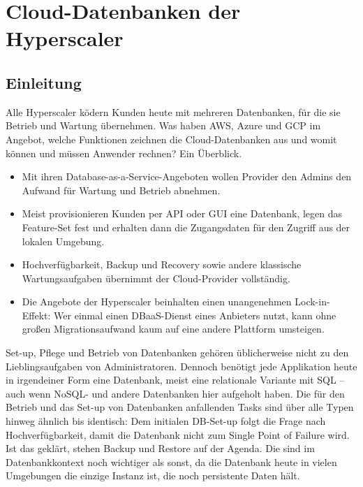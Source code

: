 %
%
%
%




\chapter{Cloud-Datenbanken der Hyperscaler}

\section{Einleitung}

Alle Hyperscaler ködern Kunden heute mit mehreren Datenbanken, für die sie Betrieb und Wartung übernehmen. Was haben AWS, Azure und GCP im Angebot, welche Funktionen zeichnen die Cloud-Datenbanken aus und womit können und müssen Anwender rechnen? Ein Überblick.

\begin{itemize}
  \item Mit ihren Database-as-a-Service-Angeboten wollen Provider den Admins den Aufwand für Wartung und Betrieb abnehmen.
  \item Meist provisionieren Kunden per API oder GUI eine Datenbank, legen das Feature-Set fest und erhalten dann die Zugangsdaten für den Zugriff aus der lokalen Umgebung.
  \item Hochverfügbarkeit, Backup und Recovery sowie andere klassische Wartungsaufgaben übernimmt der Cloud-Provider vollständig.
  \item Die Angebote der Hyperscaler beinhalten einen unangenehmen Lock-in-Effekt: Wer einmal einen DBaaS-Dienst eines Anbieters nutzt, kann ohne großen Migrationsaufwand kaum auf eine andere Plattform umsteigen.
\end{itemize}

Set-up, Pflege und Betrieb von Datenbanken gehören üblicherweise nicht zu den Lieblingsaufgaben von Administratoren. Dennoch benötigt jede Applikation heute in irgendeiner Form eine Datenbank, meist eine relationale Variante mit SQL – auch wenn NoSQL- und andere Datenbanken hier aufgeholt haben. Die für den Betrieb und das Set-up von Datenbanken anfallenden Tasks sind über alle Typen hinweg ähnlich bis identisch: Dem initialen DB-Set-up folgt die Frage nach Hochverfügbarkeit, damit die Datenbank nicht zum Single Point of Failure wird. Ist das geklärt, stehen Backup und Restore auf der Agenda. Die sind im Datenbankkontext noch wichtiger als sonst, da die Datenbank heute in vielen Umgebungen die einzige Instanz ist, die noch persistente Daten hält.


